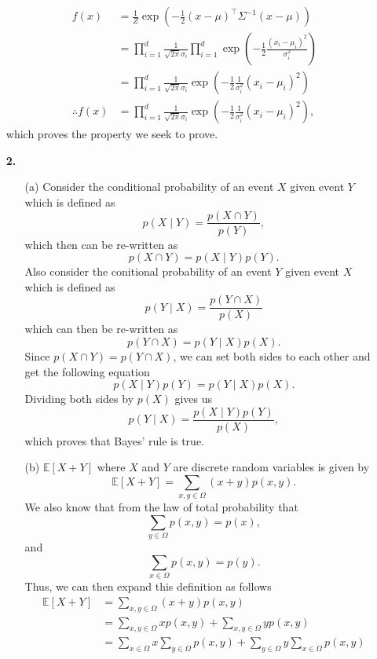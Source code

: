 \documentclass [10pt]{article}
\begin{document}
\begin{enumerate}
	\begin{align}
		f(x)&=\frac{1}{Z}\exp(-\frac{1}{2}(x-\mu)^{\top}\Sigma^{-1}(x-\mu))\nonumber\\
		&=\prod_{i=1}^{d}\frac{1}{\sqrt{2\pi}\sigma_{i}}\prod_{i=1}^{d}\exp(-\frac{1}{2}\frac{(x_{i}-\mu_{i})^{2}}{\sigma_{i}^{2}})\nonumber\\
		&=\prod_{i=1}^{d}\frac{1}{\sqrt{2\pi}\sigma_{i}}\exp(-\frac{1}{2}\frac{1}{\sigma_{i}^{2}}(x_{i}-\mu_{i})^{2})\nonumber\\
		\therefore f(x)&=\prod_{i=1}^{d}\frac{1}{\sqrt{2\pi}\sigma_{i}}\exp(-\frac{1}{2}\frac{1}{\sigma_{i}^{2}}(x_{i}-\mu_{i})^{2})\nonumber,
	\end{align}
	which proves the property we seek to prove.
	\newpage
	\item[\textbf{2.$\>$}]
	\begin{enumerate}
		\item[(a)]Consider the conditional probability of an event $X$ given event $Y$ which is defined as$$p(X\mathbin{\vert}Y)=\frac{p(X\cap Y)}{p(Y)},$$which then can be re-written as$$p(X\cap Y)=p(X\mathbin{\vert}Y)p(Y).$$Also consider the conitional probability of an event $Y$ given event $X$ which is defined as$$p(Y\mathbin{\vert}X)=\frac{p(Y\cap X)}{p(X)}$$which can then be re-written as$$p(Y\cap X)=p(Y\mathbin{\vert}X)p(X).$$Since $p(X\cap Y)=p(Y\cap X)$, we can set both sides to each other and get the following equation$$p(X\mathbin{\vert}Y)p(Y)=p(Y\mathbin{\vert}X)p(X).$$Dividing both sides by $p(X)$ gives us$$p(Y\mathbin{\vert}X)=\frac{p(X\mathbin{\vert}Y)p(Y)}{p(X)},$$which proves that Bayes' rule is true.
		\item[(b)]$\mathbb{E}[X+Y]$ where $X$ and $Y$ are discrete random variables is given by$$\mathbb{E}[X+Y]=\sum_{x,y\in\Omega}(x+y)p(x,y).$$We also know that from the law of total probability that
		\begin{equation}\label{eq:1}
			\sum_{y\in\Omega}p(x,y)=p(x),
		\end{equation}
		and
		\begin{equation}\label{eq:2}
			\sum_{x\in\Omega}p(x,y)=p(y).
		\end{equation}
		Thus, we can then expand this definition as follows
		\begin{align}
			\mathbb{E}[X+Y]&=\sum_{x,y\in\Omega}(x+y)p(x,y)\nonumber\\
			&=\sum_{x,y\in\Omega}xp(x,y)+\sum_{x,y\in\Omega}yp(x,y)\nonumber\\
			&=\sum_{x\in\Omega}x\sum_{y\in\Omega}p(x,y)+\sum_{y\in\Omega}y\sum_{x\in\Omega}p(x,y)\nonumber\\

\end{align}
\end{enumerate}
\end{enumerate}
\end{document}
